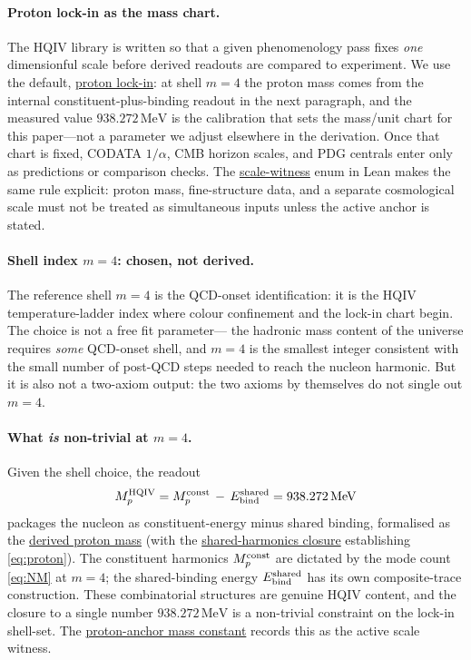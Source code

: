 \documentclass[11pt]{amsart}
\begin{document}
\paragraph{Proton lock-in as the mass chart.}
The HQIV library \cite{hqiv-lean} is written so that a given
phenomenology pass fixes \emph{one} dimensionful scale before
derived readouts are compared to experiment.  We use the default,
\hyperref[lean:proton-lockin]{proton lock-in}: at shell $m=4$ the
proton mass comes from the internal constituent-plus-binding
readout in the next paragraph, and the measured value
$938.272\,\mathrm{MeV}$ is the calibration that sets the mass/unit
chart for this paper---not a parameter we adjust elsewhere in the
derivation.  Once that chart is fixed, CODATA $1/\alpha$, CMB
horizon scales, and PDG centrals \cite{pdg2024} enter only as
predictions or comparison checks.  The
\hyperref[lean:scale-witness]{scale-witness} enum in Lean makes the
same rule explicit: proton mass, fine-structure data, and a separate
cosmological scale must not be treated as simultaneous inputs unless
the active anchor is stated.

\paragraph{Shell index $m=4$: chosen, not derived.}  The
reference shell $m=4$ is the QCD-onset identification: it is the
HQIV temperature-ladder index where colour confinement and the
lock-in chart begin.  The choice is not a free fit parameter---
the hadronic mass content of the universe requires \emph{some}
QCD-onset shell, and $m=4$ is the smallest integer consistent
with the small number of post-QCD steps needed to reach the
nucleon harmonic.  But it is also not a two-axiom output: the
two axioms by themselves do not single out $m=4$.

\paragraph{What \emph{is} non-trivial at $m=4$.}  Given the shell
choice, the readout
\begin{equation}\label{eq:proton}
  M_{p}^{\rm HQIV}
   = M^{\rm const}_{p}\,-\,E^{\rm shared}_{\rm bind}
   = 938.272\,\mathrm{MeV}
\end{equation}
packages the nucleon as constituent-energy minus shared binding,
formalised as the
\hyperref[lean:derived-proton]{derived proton mass} (with the
\hyperref[lean:proton-shared]{shared-harmonics closure} establishing
\eqref{eq:proton}).  The constituent harmonics $M^{\rm const}_{p}$
are dictated by the mode count \eqref{eq:NM} at $m=4$; the
shared-binding energy $E^{\rm shared}_{\rm bind}$ has its own
composite-trace construction.  These combinatorial structures are
genuine HQIV content, and the closure to a single number
$938.272\,\mathrm{MeV}$ is a non-trivial constraint on the
lock-in shell-set.  The
\hyperref[lean:proton-anchor]{proton-anchor mass constant} records
this as the active scale witness.
\end{document}

